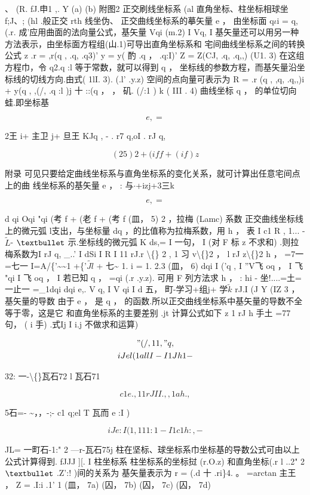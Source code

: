、 (R. fJ.申1 ,. Y (a) (b) 附图2 正交刷线坐标系 (al 直角坐标、柱坐标相球坐f;J、; (hl .般正交 rth 线坐伪、 正交曲线坐标系的摹矢量 e ， 由坐标面 q$\iota$i = q, (.r. 成'应用曲面的法向量公式，基矢量 Vqi (m.2) I Vq, I 基矢量还可以用另一种方法表示，由坐标面方程组(山.1)可导出直角坐标系和 宅间曲线坐标系之间的转换公式 z .r = ,r(q , .q, .q3)' y = y( 酌 .q ， .q:I)' Z = Z(CJ, .q, .q,,) (U1. 3) 在这组方程巾，令 q2.q :l 等于常数，就可以得到 q ， 坐标线的参数方程，而基矢量沿坐 标线的切线方向.由式( 1lI. 3). (.l' .y.z) 空间的点向量可表示为 R = .r (q , ,q, .q,,)i + y(q , ,(/, .q :l )j 十 ::(q ， ， 矶. (/:1 ) k ( III . 4) 曲线坐标 q ， 的单位切向蛙.即坐标基

\[e, =\]

2王 i+ 主卫 j+ 旦王 KJq , - . r7 q,oI . rJ q,

\[(25)2+(iff+(if)z\]

附录 可见只要给定曲线坐标系与直角坐标系的变化关系，就可计算出任意宅间点上的曲 线坐标系的基矢量 e ， : 与$\cdot $+izj+3三k

\[e, =\]

d qi Oqi "qi (考 f + (老 f + (考 f (皿， 5) 2 ，拉梅 (Lamc) 系数 正交曲线坐标线上的微元弧 l支出，与坐标量 dq ，的比值称为拉梅系数，用 h ， 表 I c1 R , 1... - $\tilde{L}$- ${\rm •}$ 示.坐标线的微元弧 K ds,= I 一句， I (对 F 标 z 不求和) .则拉梅系数为I rJ q, \_..' I dSi I  R I 11 rJ.r \textbackslash\{\} 2 , 1 习 v\textbackslash\{\}2 ， l rJ z\textbackslash\{\}2 h ， =7一=七一 I=A/\{'\textasciitilde{}\textasciitilde{}1 +\{'$\tilde{Jl}$ + 七\textasciitilde{} 1. i = 1. 2.3 (皿， 6) dqi I ('q , I ''V飞 oq ， I 飞 "qi I 飞 oq ， I 若已知 q ， =qi (.r .y.z). 可用 F 列方法求 h ， : hi - 坐!....=土=一止一 =\_1dqi dqi e,. V q, I V qi I d 五， 町-学习+组j+ 学$\tilde{k}$ rJ.I (J Y (IZ 3 ，基矢量的导数 由于 e ， 是 q ， 的函数.所以正交曲线坐标系中基矢量的导数不全等于零，这是它 和直角坐标系的主要差别 .jt 计算公式如下 z 1 rJ h 手土 =77句， ( i 手) .式Ij I i.j 不做求和运算)

\begin{gather*}
"(/, 11 , "q,\\
iJel ( 1 all I - I 1 Jh 1 -  
\end{gather*}

32: 一-\textbackslash\{\}瓦石72 l 瓦石71

\[c1 e., 1 1 rJ II ., , 1 ah.,  \]

5石=- \textasciitilde{}，，-;- c1 q;el T 瓦而 e :I )

\[iJe:I ( 1 ,111 :1 - I 1 c1h:, -  \]

JL= 一町石-1:" 2 ---r-瓦石75j 柱在坚标、球坐标系巾坐标基的导数公式可由以上公式计算得到. fJJJ ][. I 柱坐标系 柱坐标系的坐标挝 (r.O.z) 和直角坐标(.r l ..2" 2 ${\rm •}$ .Z':! )间的关系为 基矢量表示为 r = (.d 十 .ri\}4. 。 =arctan 主王 ， Z = .I:i .1' 1 (皿， 7a) (囚， 7b) (囚， 7c) (囚， 7d)

